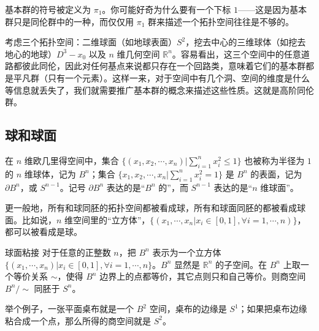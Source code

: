 
\begin{issues}
\issueDraft
\end{issues}





基本群的符号被定义为 $\pi_1$。你可能好奇为什么要有一个下标 $1$——这是因为基本群只是同伦群中的一种，而仅仅用 $\pi_1$ 群来描述一个拓扑空间往往是不够的。

考虑三个拓扑空间：二维球面（如地球表面）$S^2$，挖去中心的三维球体（如挖去地心的地球）$D^3-x_0$ 以及 $n$ 维几何空间 $\mathbb{R}^n$。容易看出，这三个空间中的任意道路都彼此同伦，因此对任何基点来说都只存在一个回路类，意味着它们的基本群都是平凡群（只有一个元素）。这样一来，对于空间中有几个洞、空间的维度是什么等信息就丢失了，我们就需要推广基本群的概念来描述这些性质。这就是高阶同伦群。

\subsection{球和球面}
在 $n$ 维欧几里得空间中，集合 $\{(x_1, x_2,\cdots,x_n)|\sum^n_{i=1}x_i^2\leq 1\}$ 也被称为半径为 $1$ 的 $n$ 维球体，记为 $B^n$；集合 $\{x_1, x_2, \cdots, x_n|\sum^n_{i=1}x_i^2=1\}$ 是 $B^n$ 的表面，记为 $\partial B^n$，或 $S^{n-1}$。记号 $\partial B^n$ 表达的是“$B^n$ 的”，而 $S^{n-1}$ 表达的是“$n$ 维球面”。

更一般地，所有和球同胚的拓扑空间都被看成球，所有和球面同胚的都被看成球面。比如说，$n$ 维空间里的“立方体”，$\{(x_1, \cdots, x_n|x_i\in[0, 1], \forall i=1, \cdots, n)\}$，都可以被看成是球。

\begin{theorem}{球面粘接}
对于任意的正整数 $n$，把 $B^n$ 表示为一个立方体 $\{(x_1, \cdots, x_n)|x_i\in[0, 1], \forall i=1, \cdots, n\}$。$B^n$ 显然是 $\mathbb{R}^n$ 的子空间。在 $B^n$ 上取一个等价关系 $\sim$，使得 $B^n$ 边界上的点都等价，其它点则只和自己等价。则商空间 $B^n/\sim$ 同胚于 $S^n$。
\end{theorem}

举个例子，一张平面桌布就是一个 $B^2$ 空间，桌布的边缘是 $S^1$；如果把桌布边缘粘合成一个点，那么所得的商空间就是 $S^2$。

